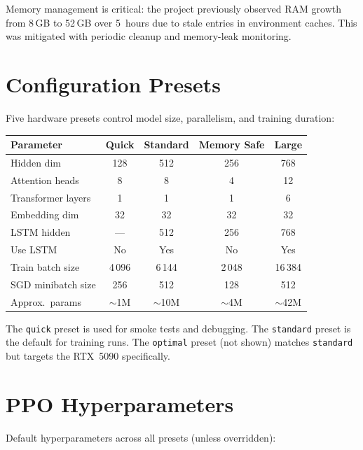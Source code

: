Memory management is critical: the project previously observed RAM growth from
8\,GB to 52\,GB over 5~hours due to stale entries in environment caches.  This
was mitigated with periodic cleanup and memory-leak monitoring.

\section{Configuration Presets}

Five hardware presets control model size, parallelism, and training duration:

\begin{center}
\small
\begin{tabularx}{\textwidth}{l c c c c}
  \toprule
  \textbf{Parameter} & \textbf{Quick} & \textbf{Standard} & \textbf{Memory Safe} & \textbf{Large} \\
  \midrule
  Hidden dim              & 128   & 512   & 256   & 768   \\
  Attention heads         & 8     & 8     & 4     & 12    \\
  Transformer layers      & 1     & 1     & 1     & 6     \\
  Embedding dim           & 32    & 32    & 32    & 32    \\
  LSTM hidden             & ---   & 512   & 256   & 768   \\
  Use LSTM                & No    & Yes   & No    & Yes   \\
  Train batch size        & 4\,096  & 6\,144  & 2\,048  & 16\,384 \\
  SGD minibatch size      & 256   & 512   & 128   & 512   \\
  Approx.\ params         & $\sim$1M & $\sim$10M & $\sim$4M & $\sim$42M \\
  \bottomrule
\end{tabularx}
\end{center}

The \texttt{quick} preset is used for smoke tests and debugging.  The
\texttt{standard} preset is the default for training runs.  The
\texttt{optimal} preset (not shown) matches \texttt{standard} but targets the
RTX~5090 specifically.

\section{PPO Hyperparameters}

Default hyperparameters across all presets (unless overridden):

